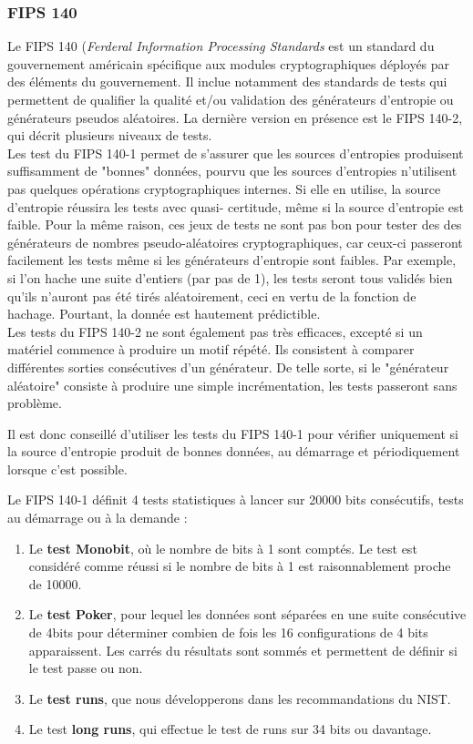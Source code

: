 	\subsubsection{FIPS 140}
		Le FIPS 140 (\textit{Ferderal Information Processing Standards} est un 
		standard du gouvernement américain spécifique aux modules cryptographiques 
		déployés par des éléments du gouvernement. Il inclue notamment des standards 
		de tests qui permettent de qualifier la qualité et/ou validation des 
		générateurs d'entropie ou générateurs pseudos aléatoires. 
		La dernière version en présence est le FIPS 140-2, qui décrit plusieurs niveaux de tests.\\
		
		
		Les test du FIPS 140-1 permet de s'assurer que les sources d'entropies 
		produisent suffisamment de "bonnes" données, pourvu que les sources d'entropies 
		n'utilisent pas quelques opérations cryptographiques internes. Si elle en utilise, 
		la source d'entropie réussira les tests avec quasi- certitude, même si la source 
		d'entropie est faible. Pour la même raison,  ces jeux de tests ne sont pas bon 
		pour tester des des générateurs de nombres pseudo-aléatoires cryptographiques, 
		car ceux-ci passeront facilement les tests même si les générateurs d'entropie 
		sont faibles. Par exemple, si l'on hache une suite d'entiers (par pas de 1), 
		les tests seront tous validés bien qu'ils n'auront pas été tirés aléatoirement, 
		ceci en vertu de la fonction de hachage. Pourtant, la donnée est hautement prédictible.\\
		
		
		Les tests du FIPS 140-2 ne sont également pas très efficaces, excepté si un matériel 
		commence à produire un motif répété. Ils consistent à comparer différentes sorties 
		consécutives d'un générateur.  De telle sorte, si le "générateur aléatoire" consiste 
		à produire une simple incrémentation, les tests passeront sans problème.
		
		Il est donc conseillé d'utiliser les tests du FIPS 140-1 pour vérifier uniquement 
		si la source d'entropie produit de bonnes données, au démarrage et périodiquement 
		lorsque c'est possible. 
		
		
		Le FIPS 140-1 définit 4 tests statistiques à lancer sur 20000 bits consécutifs, 
		tests au démarrage ou à la demande : 
		\begin{enumerate}
		\item Le \textbf{test Monobit}, où le nombre de bits à 1 sont comptés. 
		Le test est considéré comme réussi si le nombre de bits à 1 est 
		raisonnablement proche de 10000.
		\item Le \textbf{test Poker}, pour lequel les données sont séparées en 
		une suite consécutive de 4bits pour déterminer combien de fois les 16 
		configurations de 4 bits apparaissent. Les carrés du résultats sont sommés 
		et permettent de définir si le test passe ou non. 
		\item Le \textbf{test runs}, que nous développerons dans les 
		recommandations du NIST.
		\item Le test \textbf{long runs}, qui effectue le test de runs sur 
		34 bits ou davantage.\\
		\end{enumerate}
		
